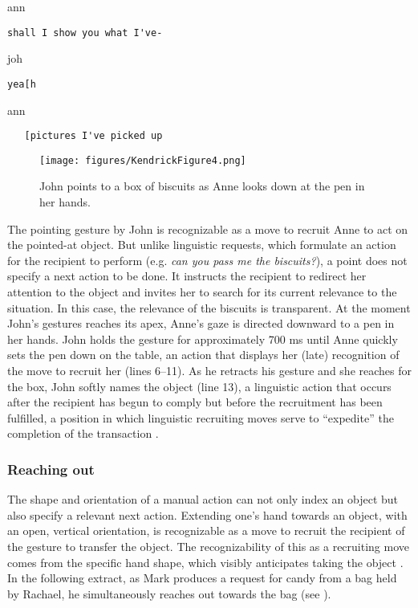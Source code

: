 \documentclass[output=paper,nonflat,modfont,draft]{langsci/langscibook}
\begin{document}

\begin{transbox}{22}{ann}
\begin{verbatim}
shall I show you what I've-
\end{verbatim}
\end{transbox}

\begin{transbox}{23}{joh}
\begin{verbatim}
yea[h
\end{verbatim}
\end{transbox}

\begin{transbox}{24}{ann}
\begin{verbatim}
   [pictures I've picked up
\end{verbatim}
\end{transbox}\bigskip

\begin{figure}
\caption{John points to a box of biscuits as Anne looks down at the pen in her hands.}
\texttt{[image: figures/KendrickFigure4.png]}
\label{fig:kendrick:4}
\end{figure}

The pointing gesture by John is recognizable as a move to recruit Anne to act on the pointed-at object. But unlike linguistic requests, which formulate an action for the recipient to perform (e.g. \textit{can you pass me the biscuits?}), a point does not specify a next action to be done. It instructs the recipient to redirect her attention to the object and invites her to search for its current relevance to the situation. In this case, the relevance of the biscuits is transparent. At the moment John’s gestures reaches its apex, Anne’s gaze is directed downward to a pen in her hands. John holds the gesture for approximately 700 ms until Anne quickly sets the pen down on the table, an action that displays her (late) recognition of the move to recruit her (lines 6--11). As he retracts his gesture and she reaches for the box, John softly names the object (line 13), a linguistic action that occurs after the recipient has begun to comply but before the recruitment has been fulfilled, a position in which linguistic recruiting moves serve to “expedite” the completion of the transaction \citep{KentKendrick2016}.

\subsubsection{Reaching out}
The shape and orientation of a manual action can not only index an object but also specify a relevant next action. Extending one’s hand towards an object, with an open, vertical orientation, is recognizable as a move to recruit the recipient of the gesture to transfer the object. The recognizability of this as a recruiting move comes from the specific hand shape, which visibly anticipates taking the object \citep[see][47 on prehensile postures]{Streeck2009}. In the following extract, as Mark produces a request for candy from a bag held by Rachael, he simultaneously reaches out towards the bag (see ).
\end{document}
